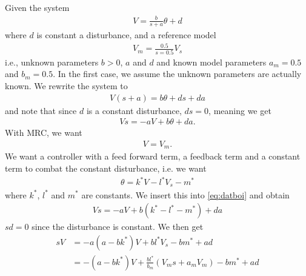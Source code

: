 \documentclass[]{article}
\begin{document}
\subsection{}
Given the system
\begin{equation}\begin{aligned}
V = \frac{b}{s+a}\theta + d
\label{eq:sys}
\end{aligned}\end{equation}
where $d$ is constant a disturbance, and a reference model
\begin{equation}\begin{aligned}
V_m = \frac{0.5}{s = 0.5}V_s
\end{aligned}\end{equation}
i.e., unknown parameters $b>0$, $a$ and $d$ and known model parameters $a_m = 0.5$ and $b_m = 0.5$.
In the first case, we assume the unknown parameters are actually known. We rewrite the system to
\begin{equation}\begin{aligned}
V(s+a) = b \theta + ds + da
\end{aligned}\end{equation}
and note that since $d$ is a constant disturbance, $ds = 0$, meaning we get
\begin{equation}\begin{aligned}
\label{eq:datboi}
Vs = -aV + b \theta + da.
\end{aligned}\end{equation}
With MRC, we want
\begin{equation}\begin{aligned}
V = V_m.
\end{aligned}\end{equation}
We want a controller with a feed forward term, a feedback term and a constant term to combat the constant disturbance, i.e. we want
\begin{equation}\begin{aligned}
\theta = k^* V - l^*V_s - m^*
\end{aligned}\end{equation}
where $k^*$, $l^*$ and $m^*$ are constants. We insert this into \eqref{eq:datboi} and obtain
\begin{equation}\begin{aligned}
Vs = -aV + b(k^* - l^* - m^*) + da
\end{aligned}\end{equation}
$sd=0$ since the disturbance is constant. We then get
\begin{equation}\begin{aligned}
sV &= -a(a - bk^*)V + bl^* V_s - bm^* + ad \\
&= -(a - bk^*) V + \frac{bl^*}{b_m}(V_ms+a_mV_m) - bm^* + ad
\end{aligned}\end{equation}
\end{document}
